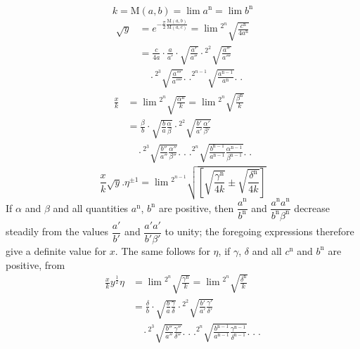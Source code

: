 \[
k=\mathrm M(a,b)=\lim a^{\mathrm n}=\lim b^{\mathrm n}
\]
\[
\begin{aligned}
\surd y&=e^{-\frac\pi2\frac{\mathrm M(a,b)}{\mathrm M(a,c)}}
=\lim{}^{2^n}\!\surd{\frac{c^{\mathrm n}}{4a^{\mathrm n}}}\\
&=\frac{c}{4a}\cdot\frac a{a'}\cdot\surd{\frac{a'}{a''}}
\cdot{}^{2^2}\!\surd{\frac{a''}{a'''}}\\&\quad\cdot{}^{2^3}\!\surd{\frac{a'''}{a''''}}
.\;.{}^{2^{n-1}}\!\surd{\frac{a^{\mathrm n-1}}{a^{\mathrm n}}}.\;.
\end{aligned}
\]
\[
\begin{aligned}
\frac xk&=\lim{}^{2^n}\!\surd{\frac{\alpha^{\mathrm n}}{k}}
=\lim{}^{2^n}\!\surd{\frac{\beta^{\mathrm n}}{k}}\\
&=\frac\beta b\cdot\surd{\frac ba\frac\alpha\beta}
\cdot{}^{2^2}\!\surd{\frac{b'}{a'}\frac{\alpha'}{\beta'}}
\\&\quad\cdot{}^{2^3}\!\surd{\frac{b''}{a''}\frac{\alpha''}{\beta''}}
.\;.\;.{}^{2^n}\!\surd{\frac{b^{\mathrm n-1}}{a^{\mathrm n-1}}\frac{\alpha^{\mathrm n-1}}{\beta^{\mathrm n-1}}}.\;.
\end{aligned}
\]
\[
\frac xk\surd y.\eta^{\pm1}
=\lim{}^{2^{n-1}}\!\surd{\left[\surd{\frac{\gamma^{\mathrm n}}{4k}}\pm\surd{\frac{\delta^{\mathrm n}}{4k}}\right]}
\]
If $\alpha$ and $\beta$ and all quantities $a^{\mathrm n}$, $b^{\mathrm n}$ are positive, then
$\dfrac{a^{\mathrm n}}{b^{\mathrm n}}$ and $\dfrac{a^{\mathrm n}a^{\mathrm n}}{b^{\mathrm n}\beta^{\mathrm n}}$ decrease steadily from the values
$\dfrac{a'}{b'}$ and $\dfrac{a'a'}{b'\beta'}$ to unity;
the foregoing expressions therefore give a definite value for $x$.
The same follows for $\eta$, if $\gamma$, $\delta$ and all $c^{\mathrm n}$ and $b^{\mathrm n}$ are positive, from
\[
\begin{aligned}
\frac xk y^{\frac12}\eta&=\lim{}^{2^n}\!\surd{\frac{\gamma^{\mathrm n}}{k}}
=\lim{}^{2^n}\!\surd{\frac{\delta^{\mathrm n}}{k}}\\
&=\frac\delta b\cdot\surd{\frac ba\frac\gamma\delta}
\cdot{}^{2^2}\!\surd{\frac{b'}{a'}\frac{\gamma'}{\delta'}}
\\&\quad\cdot{}^{2^3}\!\surd{\frac{b''}{a''}\frac{\gamma''}{\delta''}}
.\;.\;.{}^{2^n}\!\surd{\frac{b^{\mathrm n-1}}{a^{\mathrm n-1}}\frac{\gamma^{\mathrm n-1}}{\delta^{\mathrm n-1}}}.\;.\;.
\end{aligned}
\]
